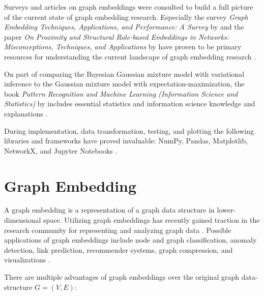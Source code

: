 \documentclass[conference]{IEEEtran}
\begin{document}
Surveys and articles on graph embeddings were consulted to build a full picture of the current state of graph embedding research. Especially the \citeyear{Goyal_2018} survey \textit{Graph Embedding Techniques, Applications, and Performance: A Survey} by \citeauthor{Goyal_2018} and the \citeyear{rossi20tkdd-roles} paper \textit{On Proximity and Structural Role-based Embeddings in Networks: Misconceptions, Techniques, and Applications} by \citeauthor{rossi20tkdd-roles} have proven to be primary resources for understanding the current landscape of graph embedding research \cite{Goyal_2018, rossi20tkdd-roles}.

On part of comparing the Bayesian Gaussian mixture model with variational inference to the Gaussian mixture model with expectation-maximization, the \citeyear{Bishop06} book \textit{Pattern Recognition and Machine Learning (Information Science and Statistics)} by \citeauthor{Bishop06} includes essential statistics and information science knowledge and explanations \cite{Bishop06}.

During implementation, data transformation, testing, and plotting the following libraries and frameworks have proved invaluable: NumPy, Pandas, Matplotlib, NetworkX, and Jupyter Notebooks \cite{harris2020array, mckinney-proc-scipy-2010, reback2020pandas, Hunter:2007, SciPyProceedings_11, Kluyver2016jupyter}.


\section{Graph Embedding}

A graph embedding is a representation of a graph data structure in lower-dimensional space. Utilizing graph embeddings has recently gained traction in the research community for representing and analyzing graph data \cite{Goyal_2018}. Possible applications of graph embeddings include node and graph classification, anomaly detection, link prediction, recommender systems, graph compression, and visualizations \cite{rossi20tkdd-roles}.

There are multiple advantages of graph embeddings over the original graph data-structure $G = (V, E)$:
\end{document}
